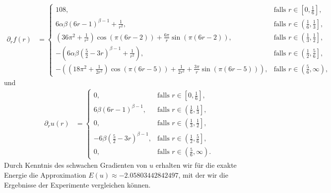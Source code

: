 \begin{align*}
  \partial_r f(r)
  &=
  \begin{cases}
    108,
    & \text{falls } r\in\left[0,\frac{1}{6}\right],\\
    6\alpha\beta(6r-1)^{\beta-1} +\frac{1}{r^2}, 
    & \text{falls } r\in\left(\frac{1}{6},\frac{1}{3}\right],\\
    \left(36\pi^2+\frac{1}{r^2}\right)\cos(\pi(6r-2))
    + \frac{6\pi}{r}\sin(\pi(6r-2)), 
    & \text{falls } r\in\left(\frac{1}{3},\frac{1}{2}\right],\\
    -\left(6\alpha\beta\left( \frac{5}{2}-3r \right)^{\beta-1}+
    \frac{1}{r^2}\right),
    & \text{falls } r\in\left(\frac{1}{2},\frac{5}{6}\right],\\
    -\left( \left( 18\pi^2+\frac{1}{2r^2} \right)\cos(\pi(6r-5))
    +\frac{1}{2r^2} + \frac{3\pi}{r}\sin(\pi(6r-5))\right), 
    &\text{falls } r\in\left(\frac{5}{6},\infty\right),
  \end{cases}
\end{align*}
und 
\begin{align*}
  \partial_r u(r) 
  &= 
  \begin{cases}
    0,
    & \text{falls } r\in\left[0,\frac{1}{6}\right],\\
    6\beta(6r-1)^{\beta-1}, 
    & \text{falls } r\in\left(\frac{1}{6},\frac{1}{3}\right],\\
    0, 
    & \text{falls } r\in\left(\frac{1}{3},\frac{1}{2}\right],\\
    -6\beta\left( \frac{5}{2}-3r \right)^{\beta-1},
    & \text{falls } r\in\left(\frac{1}{2},\frac{5}{6}\right],\\
    0,
    &\text{falls } r\in\left(\frac{5}{6},\infty\right).
  \end{cases}
\end{align*}
Durch Kenntnis des schwachen Gradienten von $u$ erhalten wir für die
exakte Energie die Approximation $E(u)\approx -2.05803442842497$, mit der
wir die Ergebnisse der Experimente vergleichen können.
